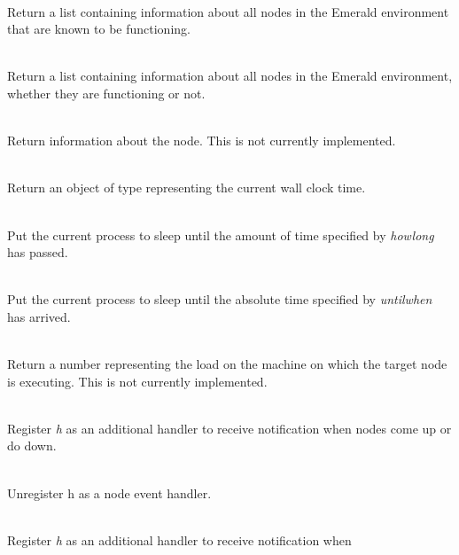 \begin{desc}
  \item[\kw{operation} getActiveNodes \returns{} \/\LB{}NodeList\/\RB{}]~\\
    Return a list containing information about all nodes in the Emerald
    environment that are known to be functioning.
  \item[\kw{operation} getAllNodes \returns{} \/\LB{}NodeList\/\RB{}]~\\
    Return a list containing information about all nodes in the Emerald
    environment, whether they are functioning or not.
  \item[\kw{operation} getNodeInformation \returns{} \/\LB{}NodeListElement\/\RB{}]~\\
    Return information about the node.  This is not currently implemented.
  \item[\kw{operation} getTimeOfDay \returns{} \/\LB{}Time\/\RB{}]~\\
    Return an object of type  representing the current wall clock
    time.
  \item[\kw{operation} delay\/\LB{}howlong \CO{} Time\/\RB{}]~\\
    Put the current process to sleep until the amount of time specified by
    {\it howlong} has passed.
  \item[\kw{operation} waitUntil\/\LB{}untilwhen \CO{} Time\/\RB{}]~\\
    Put the current process to sleep until the absolute time specified by
    {\it untilwhen} has arrived.
  \item[\kw{operation} getLoadAverage \returns{} \/\LB{}\tn{Real}\/\RB{}]~\\
    Return a  number representing the load on the machine on which
    the target node is executing.  This is not currently implemented.
  \item[\kw{operation} setNodeEventHandler\/\LB{}h \CO{} HandlerType\/\RB{}]~\\
    Register {\it h} as an additional handler to receive notification when
    nodes come up or do down.
  \item[\kw{operation} removeNodeEventHandler\/\LB{}h \CO{} HandlerType\/\RB{}]~\\
    Unregister h as a node event handler.
  \item[\kw{operation} setDiscoveredNodeEventHandler\/\LB{}h \CO{} HandlerType\/\RB{}]~\\
    Register {\it h} as an additional handler to receive notification when

\end{desc}
